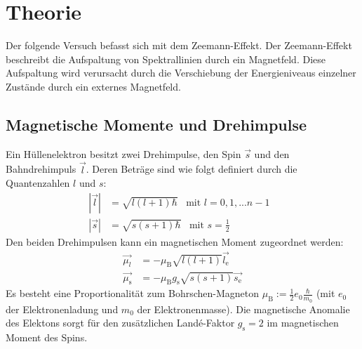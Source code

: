 \section{Theorie}
\label{sec:Theorie}
Der folgende Versuch befasst sich mit dem Zeemann-Effekt. Der Zeemann-Effekt beschreibt die Aufspaltung
von Spektrallinien durch ein Magnetfeld. Diese Aufspaltung wird verursacht durch die Verschiebung
der Energieniveaus einzelner Zustände durch ein externes Magnetfeld.

\subsection{Magnetische Momente und Drehimpulse}
Ein Hüllenelektron besitzt zwei Drehimpulse, den Spin $\vec{s}$ und den Bahndrehimpuls $\vec{l}$.
Deren Beträge sind wie folgt definiert durch die Quantenzahlen $\textit{l}$ und $s$:
\begin{align}
  |\vec{l}|&=\sqrt{\textit{l}(\textit{l}+1)\hbar}\,\,\,\,\,\text{mit $\textit{l}=0,1,...n-1$ }\\
  |\vec{s}|&=\sqrt{s(s+1)\hbar}\,\,\,\,\,\text{mit $s=\frac{1}{2}$}\
\end{align}
Den beiden Drehimpulsen kann ein magnetischen Moment zugeordnet werden:
\begin{align}
  \vec{\mu_\mathrm{\textit{l}}}&=-\mu_\mathrm{B}\sqrt{\textit{l}(\textit{l}+1)}\vec{\textit{l}_\mathrm{e}}\\
  \vec{\mu_\mathrm{s}}&=-\mu_\mathrm{B} g_\mathrm{s}\sqrt{s(s+1)}\vec{s_\mathrm{e}}
\end{align}
Es besteht eine Proportionalität zum Bohrschen-Magneton $\mu_\mathrm{B}:=\frac{1}{2}e_\mathrm{0}\frac{\hbar}{m_\mathrm{0}}$
(mit $e_\mathrm{0}$ der Elektronenladung und $m_\mathrm{0}$ der Elektronenmasse).
Die magnetische Anomalie des Elektons sorgt für den zusätzlichen Landé-Faktor $g_\mathrm{s}=2$
im magnetischen Moment des Spins.

